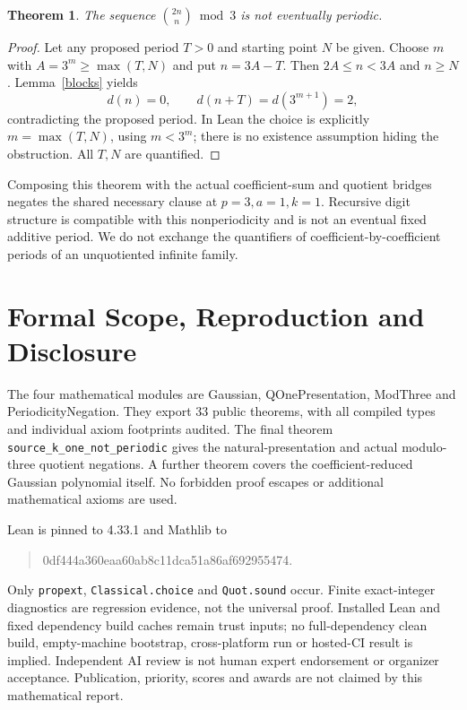 \documentclass[11pt]{article}
\newtheorem{theorem}{Theorem}
\begin{document}
\begin{theorem}
The sequence $\binom{2n}{n}\bmod3$ is not eventually periodic.
\end{theorem}
\begin{proof}
Let any proposed period $T>0$ and starting point $N$ be given. Choose
$m$ with $A=3^m\ge\max(T,N)$ and put $n=3A-T$.
Then $2A\le n<3A$ and $n\ge N$. Lemma~\ref{blocks} yields
\[
 d(n)=0,\qquad d(n+T)=d(3^{m+1})=2,
\]
contradicting the proposed period. In Lean the choice is explicitly
$m=\max(T,N)$, using $m<3^m$; there is no existence assumption hiding
the obstruction. All $T,N$ are quantified.
\end{proof}

Composing this theorem with the actual coefficient-sum and quotient bridges
negates the shared necessary clause at $p=3,a=1,k=1$. Recursive digit
structure is compatible with this nonperiodicity and is not an eventual
fixed additive period. We do not exchange the quantifiers of
coefficient-by-coefficient periods of an unquotiented infinite family.

\section{Formal Scope, Reproduction and Disclosure}
The four mathematical modules are Gaussian, QOnePresentation, ModThree and
PeriodicityNegation. They export 33 public theorems, with all compiled types
and individual axiom footprints audited. The final theorem
\texttt{source\_k\_one\_not\_periodic} gives the natural-presentation and
actual modulo-three quotient negations. A further theorem covers the
coefficient-reduced Gaussian polynomial itself. No forbidden proof escapes
or additional mathematical axioms are used.

Lean is pinned to 4.33.1 and Mathlib to
\begin{quote}\small\ttfamily
0df444a360eaa60ab8c11dca51a86af692955474.
\end{quote}
Only \texttt{propext}, \texttt{Classical.choice} and \texttt{Quot.sound}
occur. Finite exact-integer diagnostics are regression evidence, not the
universal proof. Installed Lean and fixed dependency build caches remain
trust inputs; no full-dependency clean build, empty-machine bootstrap,
cross-platform run or hosted-CI result is implied. Independent AI review
is not human expert endorsement or organizer acceptance. Publication,
priority, scores and awards are not claimed by this mathematical report.
\end{document}
